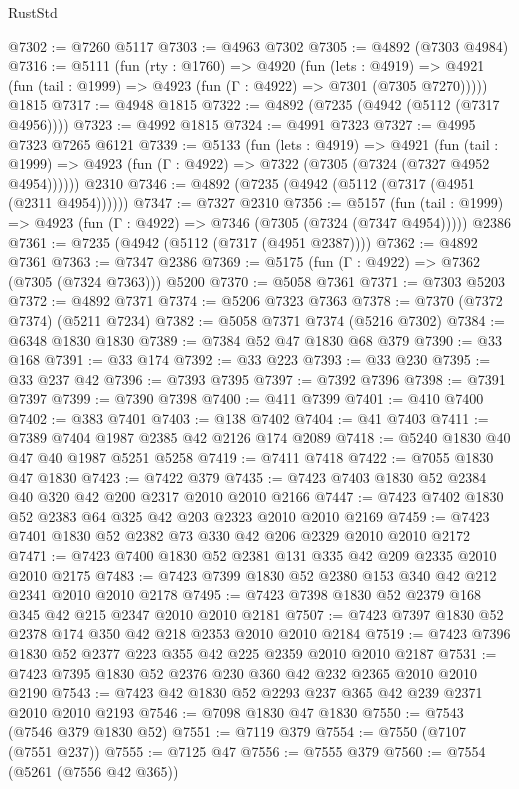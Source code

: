 \begin{lexlean}{RustStd}
\begin{coremodule}
@7302 := @7260 @5117
@7303 := @4963 @7302
@7305 := @4892 (@7303 @4984)
@7316 := @5111
    (fun (rty : @1760) =>
    @4920
      (fun (lets : @4919) =>
      @4921 (fun (tail : @1999) => @4923 (fun (Γ : @4922) => @7301 (@7305 @7270)))))
    @1815
@7317 := @4948 @1815
@7322 := @4892 (@7235 (@4942 (@5112 (@7317 @4956))))
@7323 := @4992 @1815
@7324 := @4991 @7323
@7327 := @4995 @7323 @7265 @6121
@7339 := @5133
    (fun (lets : @4919) =>
    @4921
      (fun (tail : @1999) => @4923 (fun (Γ : @4922) => @7322 (@7305 (@7324 (@7327 @4952 @4954))))))
    @2310
@7346 := @4892 (@7235 (@4942 (@5112 (@7317 (@4951 (@2311 @4954))))))
@7347 := @7327 @2310
@7356 := @5157
    (fun (tail : @1999) => @4923 (fun (Γ : @4922) => @7346 (@7305 (@7324 (@7347 @4954)))))
    @2386
@7361 := @7235 (@4942 (@5112 (@7317 (@4951 @2387))))
@7362 := @4892 @7361
@7363 := @7347 @2386
@7369 := @5175 (fun (Γ : @4922) => @7362 (@7305 (@7324 @7363))) @5200
@7370 := @5058 @7361
@7371 := @7303 @5203
@7372 := @4892 @7371
@7374 := @5206 @7323 @7363
@7378 := @7370 (@7372 @7374) (@5211 @7234)
@7382 := @5058 @7371 @7374 (@5216 @7302)
@7384 := @6348 @1830 @1830
@7389 := @7384 @52 @47 @1830 @68 @379
@7390 := @33 @168
@7391 := @33 @174
@7392 := @33 @223
@7393 := @33 @230
@7395 := @33 @237 @42
@7396 := @7393 @7395
@7397 := @7392 @7396
@7398 := @7391 @7397
@7399 := @7390 @7398
@7400 := @411 @7399
@7401 := @410 @7400
@7402 := @383 @7401
@7403 := @138 @7402
@7404 := @41 @7403
@7411 := @7389 @7404 @1987 @2385 @42 @2126 @174 @2089
@7418 := @5240 @1830 @40 @47 @40 @1987 @5251 @5258
@7419 := @7411 @7418
@7422 := @7055 @1830 @47 @1830
@7423 := @7422 @379
@7435 := @7423 @7403 @1830 @52 @2384 @40 @320 @42 @200 @2317 @2010 @2010 @2166
@7447 := @7423 @7402 @1830 @52 @2383 @64 @325 @42 @203 @2323 @2010 @2010 @2169
@7459 := @7423 @7401 @1830 @52 @2382 @73 @330 @42 @206 @2329 @2010 @2010 @2172
@7471 := @7423 @7400 @1830 @52 @2381 @131 @335 @42 @209 @2335 @2010 @2010 @2175
@7483 := @7423 @7399 @1830 @52 @2380 @153 @340 @42 @212 @2341 @2010 @2010 @2178
@7495 := @7423 @7398 @1830 @52 @2379 @168 @345 @42 @215 @2347 @2010 @2010 @2181
@7507 := @7423 @7397 @1830 @52 @2378 @174 @350 @42 @218 @2353 @2010 @2010 @2184
@7519 := @7423 @7396 @1830 @52 @2377 @223 @355 @42 @225 @2359 @2010 @2010 @2187
@7531 := @7423 @7395 @1830 @52 @2376 @230 @360 @42 @232 @2365 @2010 @2010 @2190
@7543 := @7423 @42 @1830 @52 @2293 @237 @365 @42 @239 @2371 @2010 @2010 @2193
@7546 := @7098 @1830 @47 @1830
@7550 := @7543 (@7546 @379 @1830 @52)
@7551 := @7119 @379
@7554 := @7550 (@7107 (@7551 @237))
@7555 := @7125 @47
@7556 := @7555 @379
@7560 := @7554 (@5261 (@7556 @42 @365))

\end{coremodule}
\end{lexlean}
